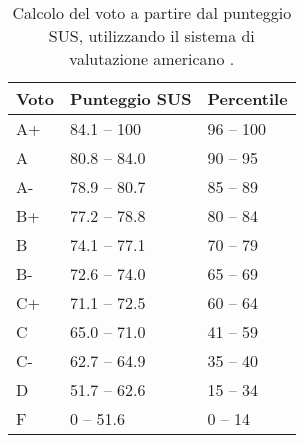 \begin{center}
    \begin{table}[H]
        \centering
        \begin{tabularx}{\textwidth}{|X|X|X|}
            \hline
            \textbf{Voto} & \textbf{Punteggio SUS} & \textbf{Percentile} \\
            \hline
            A+  & 84.1 -- 100   & 96 -- 100 \\
            A   & 80.8 -- 84.0  & 90 -- 95  \\
            A-  & 78.9 -- 80.7  & 85 -- 89  \\
            B+  & 77.2 -- 78.8  & 80 -- 84  \\
            B   & 74.1 -- 77.1  & 70 -- 79  \\
            B-  & 72.6 -- 74.0  & 65 -- 69  \\
            C+  & 71.1 -- 72.5  & 60 -- 64  \\
            C   & 65.0 -- 71.0  & 41 -- 59  \\
            C-  & 62.7 -- 64.9  & 35 -- 40  \\
            D   & 51.7 -- 62.6  & 15 -- 34  \\
            F   & 0 -- 51.6     & 0 -- 14   \\
            \hline
        \end{tabularx}
        \caption[Calcolo del voto a partire dal punteggio SUS]{Calcolo del voto a partire dal punteggio SUS, utilizzando il sistema di valutazione americano \cite{SUS}.}
        \label{tab:sus_grading_system}
    \end{table}
\end{center}

